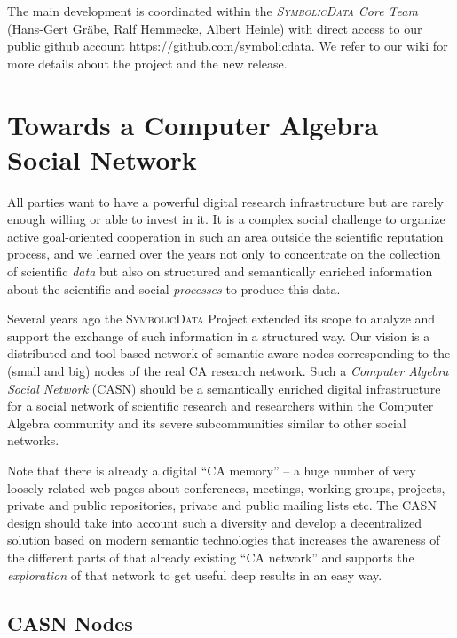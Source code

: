 \documentclass{mathincs}
\newcommand{\SD}{\textsc{Symbo\-lic\-Data}}
\begin{document}
The main development is coordinated within the \emph{{\SD} Core Team}
(Hans-Gert Gr\"abe, Ralf Hemmecke, Albert Heinle) with direct access to our
public github account \url{https://github.com/symbolicdata}.  We refer to our
wiki \cite{sdwiki} for more details about the project and the new release.

\section{Towards a Computer Algebra Social Network}

All parties want to have a powerful digital research infrastructure but are
rarely enough willing or able to invest in it.  It is a complex social
challenge to organize active goal-oriented cooperation in such an area outside
the scientific reputation process, and we learned over the years not only to
concentrate on the collection of scientific \emph{data} but also on structured
and semantically enriched information about the scientific and social
\emph{processes} to produce this data.

Several years ago the {\SD} Project extended its scope to analyze and support
the exchange of such information in a structured way.  Our vision is a
distributed and tool based network of semantic aware nodes corresponding to the
(small and big) nodes of the real CA research network.  Such a \emph{Computer
  Algebra Social Network} (CASN) should be a semantically enriched digital
infra\-structure for a social network of scientific research and researchers
within the Computer Algebra community and its severe subcommunities similar to
other social networks.

Note that there is already a digital ``CA memory'' -- a huge number of very
loosely related web pages about conferences, meetings, working groups,
projects, private and public repositories, private and public mailing lists
etc. The CASN design should take into account such a diversity and develop a
decentralized solution based on modern semantic technologies that increases the
awareness of the different parts of that already existing ``CA network'' and
supports the \emph{exploration} of that network to get useful deep results in
an easy way.

\subsection{CASN Nodes}
\end{document}
